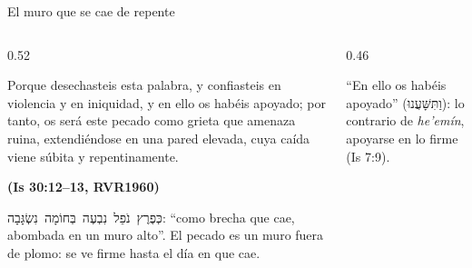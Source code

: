\documentclass[hyperref={bookmarks=false},aspectratio=169]{beamer}
\newcommand{\heb}[1]{\mbox{\foreignlanguage{hebrew}{#1}}}
\newcommand{\fuente}[1]{\par\hfill{\upshape\bfseries\footnotesize\textcolor{azul}{#1}}}
\begin{document}
\begin{frame}{El muro que se cae de repente}
\begin{columns}[c,onlytextwidth]
\begin{column}{0.52\textwidth}
\begin{cita}Porque desechasteis esta palabra, y confiasteis en violencia y en iniquidad, y en ello os habéis apoyado; por tanto, os será este pecado como grieta que amenaza ruina, extendiéndose en una pared elevada, cuya caída viene súbita y repentinamente.\fuente{(Is 30:12--13, RVR1960)}\end{cita}
\scriptsize\heb{כְּפֶרֶץ נֹפֵל נִבְעֶה בְּחוֹמָה נִשְׂגָּבָה}: ``como brecha que cae, abombada en un muro alto''. El pecado es un muro fuera de plomo: se ve firme hasta el día en que cae.
\end{column}
\begin{column}{0.46\textwidth}
\centering
{}\par\smallskip
\scriptsize ``En ello os habéis apoyado'' (\heb{וַתִּשָּׁעֲנוּ}): lo contrario de \emph{he'emín}, apoyarse en lo firme (Is 7:9).
\end{column}
\end{columns}
\end{frame}
\end{document}
